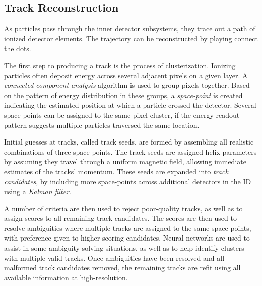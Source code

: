         \subsection{Track Reconstruction}

            As particles pass through the inner detector subsystems, they trace out a path of ionized detector elements.
            The trajectory can be reconstructed by playing connect the dots.

            The first step to producing a track is the process of clusterization.
            Ionizing particles often deposit energy across several adjacent pixels on a given layer.
            A \textit{connected component analysis} algorithm is used to group pixels together.
            Based on the pattern of energy distribution in these groups,
                a \textit{space-point} is created indicating the estimated position at which a particle crossed the detector.
            Several space-points can be assigned to the same pixel cluster,
                if the energy readout pattern suggests multiple particles traversed the same location.

            Initial guesses at tracks, called track seeds, are formed by assembling all realistic combinations of three space-points.
            The track seeds are assigned helix parameters by assuming they travel through a uniform magnetic field,
                allowing immediate estimates of the tracks' momentum.
            These seeds are expanded into \textit{track candidates},
                by including more space-points across additional detectors in the ID using a \textit{Kalman filter}.

            A number of criteria are then used to reject poor-quality tracks, as well as to assign scores to all remaining track candidates.
            The scores are then used to resolve ambiguities where multiple tracks are assigned to the same space-points,
                with preference given to higher-scoring candidates.
            Neural networks are used to assist in some ambiguity solving situations,
                as well as to help identify clusters with multiple valid tracks.
            Once ambiguities have been resolved and all malformed track candidates removed,
                the remaining tracks are refit using all available information at high-resolution\cite{atlas_track_reco_performance}.


